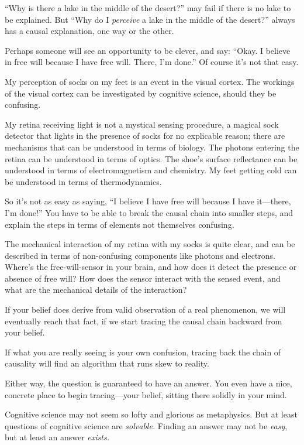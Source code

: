 {
 ``Why is there a lake in the middle of the
desert?'' may fail if there is no lake to be
explained. But ``Why do I \textit{perceive} a lake in
the middle of the desert?'' always has a causal
explanation, one way or the other.}

{
 Perhaps someone will see an opportunity to be clever, and say:
``Okay. I believe in free will because I have free
will. There, I'm done.'' Of course
it's not that easy.}

{
 My perception of socks on my feet is an event in the visual
cortex. The workings of the visual cortex can be investigated by
cognitive science, should they be confusing.}

{
 My retina receiving light is not a mystical sensing procedure, a
magical sock detector that lights in the presence of socks for no
explicable reason; there are mechanisms that can be understood in terms
of biology. The photons entering the retina can be understood in terms
of optics. The shoe's surface reflectance can be
understood in terms of electromagnetism and chemistry. My feet getting
cold can be understood in terms of thermodynamics.}

{
 So it's not as easy as saying,
``I believe I have free will because I have
it---there, I'm done!'' You have to
be able to break the causal chain into smaller steps, and explain the
steps in terms of elements not themselves confusing.}

{
 The mechanical interaction of my retina with my socks is quite
clear, and can be described in terms of non-confusing components like
photons and electrons. Where's the free-will-sensor in
your brain, and how does it detect the presence or absence of free
will? How does the sensor interact with the sensed event, and what are
the mechanical details of the interaction?}

{
 If your belief does derive from valid observation of a real
phenomenon, we will eventually reach that fact, if we start tracing the
causal chain backward from your belief.}

{
 If what you are really seeing is your own confusion, tracing back
the chain of causality will find an algorithm that runs skew to
reality.}

{
 Either way, the question is guaranteed to have an answer. You even
have a nice, concrete place to begin tracing---your belief, sitting
there solidly in your mind.}

{
 Cognitive science may not seem so lofty and glorious as
metaphysics. But at least questions of cognitive science are
\textit{solvable.} Finding an answer may not be \textit{easy}, but at
least an answer \textit{exists.}}

